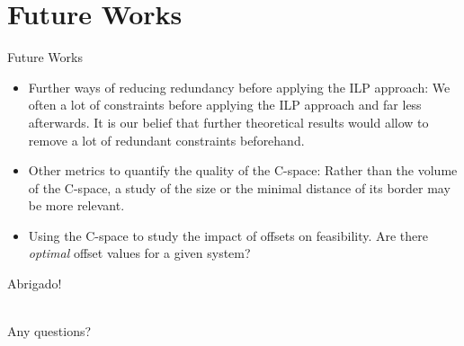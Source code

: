 \documentclass{beamer}
\begin{document}
\section{Future Works}

    \begin{frame}
    \end{frame}

    \begin{frame}{Future Works}

    \begin{itemize}
        \item Further ways of reducing redundancy before applying the ILP approach: We often a lot of constraints before applying the ILP approach and far less afterwards. It is our belief that further theoretical results would allow to remove a lot of redundant constraints beforehand.
        \item Other metrics to quantify the quality of the C-space: Rather than the volume of the C-space, a study of the size or the minimal distance of its border may be more relevant.
        \item Using the C-space to study the impact of offsets on feasibility. Are there \emph{optimal} offset values for a given system?
    \end{itemize}

    \end{frame}

\begin{frame}

    \begin{center}
    \huge Abrigado!

    ~\\

    \normalsize Any questions?
    \end{center}

\end{frame}



\end{document}
